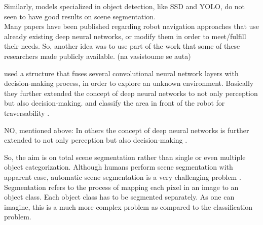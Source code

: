 \documentclass[12pt,a4paper]{report}
\newcommand{\acronym}{\MakeUppercase}
\begin{document}
	Similarly, models specialized in object detection, like \acronym{ssd} and \acronym{yolo}, 
	do not seen to have good results on scene segmentation.
	\\
	
	Many papers have been published regarding robot navigation approaches that use 
	already existing deep neural networks, or modify them in order to meet/fulfill their needs.
	So, another idea was to use part of the work that some of these researchers made 
	publicly available. 
	(na vasistoume se auta)
	\par
	\citet{Tai} used a structure that fuses several convolutional neural network layers 
	with decision-making process, in order to explore an unknown environment. 
	Basically 
	they further extended the concept of deep neural networks to not only perception but 
	also decision-making.
	\citet{Sermanet} and \citet{Hadsell} classify the area in front of the robot for 
	traversability . 
	
	NO, mentioned above: In others the concept of deep 
	neural networks is further extended to not only perception but also decision-making 
	\citep{Tai}.
	

	
	
	So, the aim is on total scene segmentation rather than single or even multiple 
	object categorization. Although humans perform scene segmentation with apparent 
	ease, automatic scene segmentation is a very challenging problem \citep{Wang}. 
	Segmentation refers to the process of mapping each pixel in an image to an object 
	class. Each object class has to be segmented separately. As one can imagine, this 
	is a much more complex problem as compared to the classification problem.	
	\\ 
	
	
	
	
	
		
\end{document}
